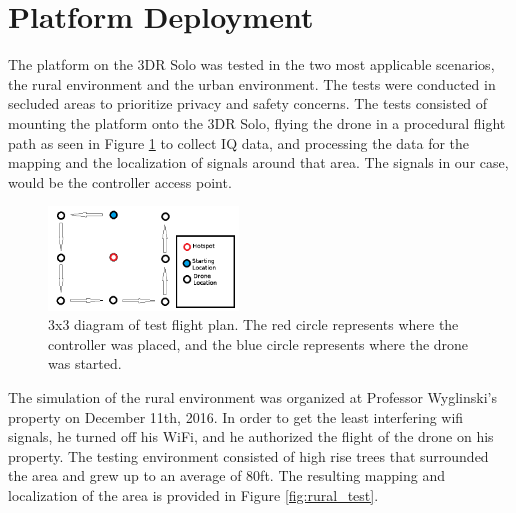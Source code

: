\documentclass[journal,transmag]{IEEEtran}
\begin{document}
\section{Platform Deployment}
The platform on the 3DR Solo was tested in the two most applicable scenarios, the rural environment and the urban environment. The tests were conducted in secluded areas to prioritize privacy and safety concerns. The tests consisted of mounting the platform onto the 3DR Solo, flying the drone in a procedural flight path as seen in Figure \ref{fig:test_setup} to collect IQ data, and processing the data for the mapping and the localization of signals around that area. The signals in our case, would be the controller access point. 

\begin{figure}[ht!]
  \centering
  \includegraphics[width=0.45\textwidth]{img/Test_Plan_legend.png}
  \caption{3x3 diagram of test flight plan. The red circle represents where the controller was placed, and the blue circle represents where the drone was started.}
  \label{fig:test_setup}
\end{figure} \par

The simulation of the rural environment was organized at Professor Wyglinski's property on December 11th, 2016. In order to get the least interfering wifi signals, he turned off his WiFi, and he authorized the flight of the drone on his property. The testing environment consisted of high rise trees that surrounded the area and grew up to an average of 80ft. The resulting mapping and localization of the area is provided in Figure \ref{fig:rural_test}.
\end{document}
